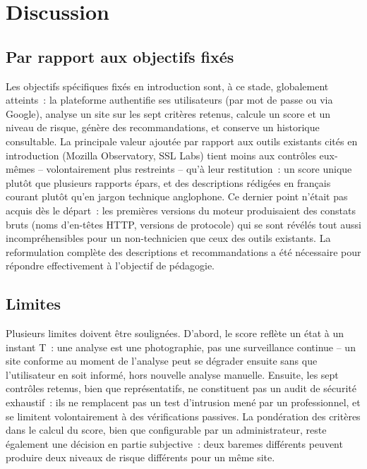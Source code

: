 \section{Discussion}

\subsection{Par rapport aux objectifs fix\'es}

Les objectifs sp\'ecifiques fix\'es en introduction sont, \`a ce stade,
globalement atteints~: la plateforme authentifie ses utilisateurs (par mot de
passe ou via Google), analyse un site sur les sept crit\`eres retenus, calcule
un score et un niveau de risque, g\'en\`ere des recommandations, et conserve un
historique consultable. La principale valeur ajout\'ee par rapport aux outils
existants cit\'es en introduction (Mozilla Observatory, SSL Labs) tient moins
aux contr\^oles eux-m\^emes -- volontairement plus restreints -- qu'\`a leur
restitution~: un score unique plut\^ot que plusieurs rapports \'epars, et des
descriptions r\'edig\'ees en fran\c{c}ais courant plut\^ot qu'en jargon technique
anglophone. Ce dernier point n'\'etait pas acquis d\`es le d\'epart~: les
premi\`eres versions du moteur produisaient des constats bruts (noms
d'en-t\^etes HTTP, versions de protocole) qui se sont r\'ev\'el\'es tout aussi
incompr\'ehensibles pour un non-technicien que ceux des outils existants. La
reformulation compl\`ete des descriptions et recommandations a \'et\'e n\'ecessaire
pour r\'epondre effectivement \`a l'objectif de p\'edagogie.

\subsection{Limites}

Plusieurs limites doivent \^etre soulign\'ees. D'abord, le score refl\`ete un
\'etat \`a un instant T~: une analyse est une photographie, pas une surveillance
continue -- un site conforme au moment de l'analyse peut se d\'egrader ensuite
sans que l'utilisateur en soit inform\'e, hors nouvelle analyse manuelle.
Ensuite, les sept contr\^oles retenus, bien que repr\'esentatifs, ne constituent
pas un audit de s\'ecurit\'e exhaustif~: ils ne remplacent pas un test
d'intrusion men\'e par un professionnel, et se limitent volontairement \`a des
v\'erifications passives. La pond\'eration des crit\`eres dans le calcul du score,
bien que configurable par un administrateur, reste \'egalement une d\'ecision en
partie subjective~: deux baremes diff\'erents peuvent produire deux niveaux de
risque diff\'erents pour un m\^eme site.

